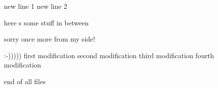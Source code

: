 new line 1
new line 2


here s some stuff in between

sorry once more from my side!

 :-)))))
first modification
second modification
third modification
fourth modification

end of all files

